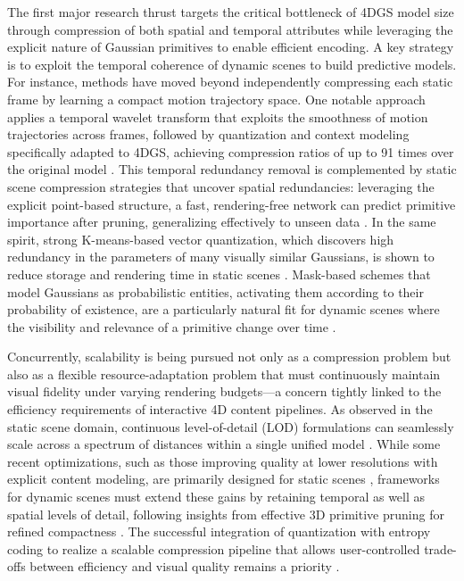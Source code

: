 \documentclass[11pt,a4paper]{article}
\begin{document}
The first major research thrust targets the critical bottleneck of 4DGS model size through compression of both spatial and temporal attributes while leveraging the explicit nature of Gaussian primitives to enable efficient encoding. A key strategy is to exploit the temporal coherence of dynamic scenes to build predictive models. For instance, methods have moved beyond independently compressing each static frame by learning a compact motion trajectory space. One notable approach applies a temporal wavelet transform that exploits the smoothness of motion trajectories across frames, followed by quantization and context modeling specifically adapted to 4DGS, achieving compression ratios of up to 91 times over the original model \cite{arxiv:2507.17336v3}. This temporal redundancy removal is complemented by static scene compression strategies that uncover spatial redundancies: leveraging the explicit point-based structure, a fast, rendering-free network can predict primitive importance after pruning, generalizing effectively to unseen data \cite{arxiv:2602.19753v1}. In the same spirit, strong K-means-based vector quantization, which discovers high redundancy in the parameters of many visually similar Gaussians, is shown to reduce storage and rendering time in static scenes \cite{arxiv:2311.18159v3}. Mask-based schemes that model Gaussians as probabilistic entities, activating them according to their probability of existence, are a particularly natural fit for dynamic scenes where the visibility and relevance of a primitive change over time \cite{arxiv:2412.20522v3}.

Concurrently, scalability is being pursued not only as a compression problem but also as a flexible resource-adaptation problem that must continuously maintain visual fidelity under varying rendering budgets---a concern tightly linked to the efficiency requirements of interactive 4D content pipelines. As observed in the static scene domain, continuous level-of-detail (LOD) formulations can seamlessly scale across a spectrum of distances within a single unified model \cite{arxiv:2501.13558v3}. While some recent optimizations, such as those improving quality at lower resolutions with explicit content modeling, are primarily designed for static scenes \cite{arxiv:2412.13547v3}, frameworks for dynamic scenes must extend these gains by retaining temporal as well as spatial levels of detail, following insights from effective 3D primitive pruning for refined compactness \cite{arxiv:2411.06019v3}. The successful integration of quantization with entropy coding to realize a scalable compression pipeline that allows user-controlled trade-offs between efficiency and visual quality remains a priority \cite{arxiv:2507.17336v3}.
\end{document}
